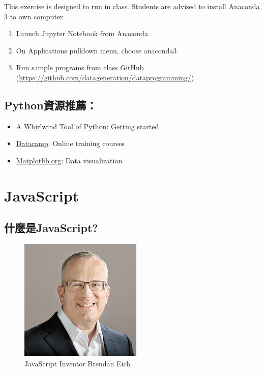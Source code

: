 \documentclass[]{book}
\providecommand{\tightlist}{%
  \setlength{\itemsep}{0pt}\setlength{\parskip}{0pt}}
\begin{document}
This exercise is designed to run in class. Students are advised to install Anaconda 3 to own computer.

\begin{enumerate}
\def\labelenumi{\arabic{enumi}.}
\tightlist
\item
  Launch Jupyter Notebook from Anaconda
\item
  On Applications pulldown menu, choose anaconda3
\item
  Run sample programs from class GitHub (\url{https://github.com/datageneration/dataprogramming/})
\end{enumerate}

\hypertarget{python-4}{%
\section{Python資源推薦：}\label{python-4}}

\begin{itemize}
\tightlist
\item
  \href{https://jakevdp.github.io/WhirlwindTourOfPython/00-introduction.html}{A Whirlwind Tool of Python}: Getting started
\item
  \href{https://datacamp.com}{Datacamp}: Online training courses
\item
  \href{http://matplotlib.org}{Matplotlib.org}: Data visualization
\end{itemize}

\hypertarget{javascript}{%
\chapter{JavaScript}\label{javascript}}

\hypertarget{javascript-1}{%
\section{什麼是JavaScript?}\label{javascript-1}}

\begin{figure}

\hfill{}\includegraphics[width=0.25\linewidth]{JavaScriptinventor} 

\caption{JavaScript Inventor Brendan Eich}\label{fig:JavaScriptinventor}
\end{figure}
\end{document}
